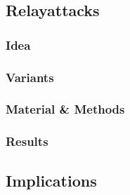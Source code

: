 
\subsection{Relayattacks}
\subsubsection*{Idea}
\subsubsection*{Variants}
\subsubsection*{Material \& Methods}

\subsubsection*{Results}

\subsection*{Implications}
